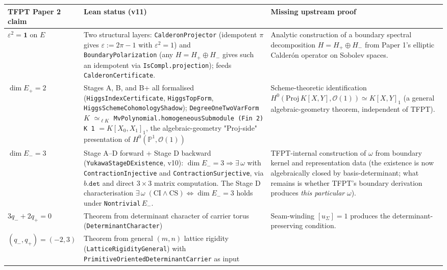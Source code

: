 \documentclass[11pt,a4paper]{article}
\begin{document}
\smallskip
\begin{center}
\footnotesize
\begin{tabularx}{\textwidth}{@{}p{}p{}Y@{}}
\toprule
\textbf{TFPT Paper 2 claim} & \textbf{Lean status (v11)} & \textbf{Missing upstream proof} \\
\midrule
$\varepsilon^2 = \mathbf 1$ on $E$ &
  Two structural layers: \texttt{CalderonProjector}
  (idempotent $\pi$ gives $\varepsilon := 2\pi-1$ with $\varepsilon^2 = 1$)
  and \texttt{BoundaryPolarization} (any
  $H = H_+ \oplus H_-$ gives such an idempotent via
  \texttt{IsCompl.projection}); feeds
  \texttt{CalderonCertificate}. &
  Analytic construction of a boundary spectral decomposition
  $H = H_+ \oplus H_-$ from Paper 1's elliptic Calder\'on
  operator on Sobolev spaces. \\[3pt]
$\dim E_+ = 2$ &
  Stages A, B, and B+ all formalised
  (\texttt{HiggsIndexCertificate},
  \texttt{HiggsTopForm},
  \texttt{HiggsSchemeCohomologyShadow});
  \texttt{DegreeOneTwoVarForm}\,$K$ $\simeq_{\ell K}$
  \texttt{MvPolynomial.homogeneousSubmodule (Fin 2) K 1}
  $= K[X_0, X_1]_1$, the algebraic-geometry "Proj-side"
  presentation of $H^0(\mathbb P^1, \mathcal O(1))$ &
  Scheme-theoretic identification
  $H^0(\mathrm{Proj}\,K[X,Y], \mathcal O(1)) \simeq K[X, Y]_1$
  (a general algebraic-geometry theorem, independent of TFPT). \\[3pt]
$\dim E_- = 3$ &
  Stage A--D forward + Stage D backward
  (\texttt{YukawaStageDExistence}, v10):
  $\dim E_- = 3 \Rightarrow \exists\,\omega$
  with \texttt{ContractionInjective} and
  \texttt{ContractionSurjective}, via $b.\texttt{det}$ and
  direct $3{\times}3$ matrix computation. The Stage D
  characterisation
  $\exists\,\omega\;(\textrm{CI} \wedge \textrm{CS})
    \iff \dim E_- = 3$ holds under \texttt{Nontrivial}\,$E_-$. &
  TFPT-internal construction of $\omega$ from boundary kernel
  and representation data (the existence is now algebraically
  closed by basis-determinant; what remains is whether TFPT's
  boundary derivation produces \emph{this particular}
  $\omega$). \\[3pt]
$3 q_- + 2 q_+ = 0$ &
  Theorem from determinant character of carrier torus
  (\texttt{DeterminantCharacter}) &
  Seam-winding $[u_\Sigma] = 1$ produces the determinant-
  preserving condition. \\[3pt]
$(q_-, q_+) = (-2, 3)$ &
  Theorem from general $(m,n)$ lattice rigidity
  (\texttt{LatticeRigidityGeneral}) with
  \texttt{PrimitiveOrientedDeterminantCarrier} as input &

\end{tabularx}
\end{center}
\end{document}
